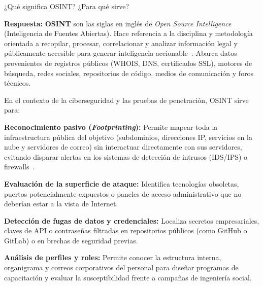 ¿Qué significa OSINT? ¿Para qué sirve?

\textbf{Respuesta:}
\textbf{OSINT} son las siglas en inglés de \textit{Open Source Intelligence} (Inteligencia de Fuentes Abiertas). Hace referencia a la disciplina y metodología orientada a recopilar, procesar, correlacionar y analizar información legal y públicamente accesible para generar inteligencia accionable~\cite{bazzell_osint}. Abarca datos provenientes de registros públicos (WHOIS, DNS, certificados SSL), motores de búsqueda, redes sociales, repositorios de código, medios de comunicación y foros técnicos.

En el contexto de la ciberseguridad y las pruebas de penetración, OSINT sirve para:
\begin{itemizeColor}
    \item \textbf{Reconocimiento pasivo (\textit{Footprinting}):} Permite mapear toda la infraestructura pública del objetivo (subdominios, direcciones IP, servicios en la nube y servidores de correo) sin interactuar directamente con sus servidores, evitando disparar alertas en los sistemas de detección de intrusos (IDS/IPS) o firewalls~\cite{nist_sp800_115, mitre_attack_recon}.
    \item \textbf{Evaluación de la superficie de ataque:} Identifica tecnologías obsoletas, puertos potencialmente expuestos o paneles de acceso administrativo que no deberían estar a la vista de Internet.
    \item \textbf{Detección de fugas de datos y credenciales:} Localiza secretos empresariales, claves de API o contraseñas filtradas en repositorios públicos (como GitHub o GitLab) o en brechas de seguridad previas.
    \item \textbf{Análisis de perfiles y roles:} Permite conocer la estructura interna, organigrama y correos corporativos del personal para diseñar programas de capacitación y evaluar la susceptibilidad frente a campañas de ingeniería social.
\end{itemizeColor}

